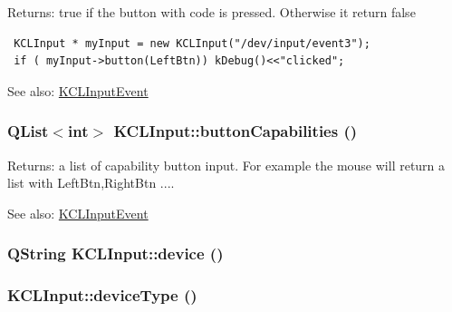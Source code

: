 \begin{Desc}
\item[Returns:]true if the button with code is pressed. Otherwise it return false 

\begin{Code}\begin{verbatim} KCLInput * myInput = new KCLInput("/dev/input/event3");
 if ( myInput->button(LeftBtn)) kDebug()<<"clicked";
\end{verbatim}
\end{Code}

 \end{Desc}
\begin{Desc}
\item[See also:]\hyperlink{class_k_c_l_input_event}{KCLInputEvent} \end{Desc}
\hypertarget{class_k_c_l_input_ae4174869c6bf29b6c59afa58c718275}{
\subsubsection[{buttonCapabilities}]{\setlength{\rightskip}{0pt plus 5cm}QList$<$int$>$ KCLInput::buttonCapabilities ()}}
\label{class_k_c_l_input_ae4174869c6bf29b6c59afa58c718275}


\begin{Desc}
\item[Returns:]a list of capability button input. For example the mouse will return a list with LeftBtn,RightBtn .... \end{Desc}
\begin{Desc}
\item[See also:]\hyperlink{class_k_c_l_input_event}{KCLInputEvent} \end{Desc}
\hypertarget{class_k_c_l_input_99047eea6d01d09f72a49dd219ce44e9}{
\subsubsection[{device}]{\setlength{\rightskip}{0pt plus 5cm}QString KCLInput::device ()}}
\label{class_k_c_l_input_99047eea6d01d09f72a49dd219ce44e9}


\hypertarget{class_k_c_l_input_cbbc1f4e0b0e7869d88173603f2f0c68}{
\subsubsection[{deviceType}]{ KCLInput::deviceType ()}}
\label{class_k_c_l_input_cbbc1f4e0b0e7869d88173603f2f0c68}


